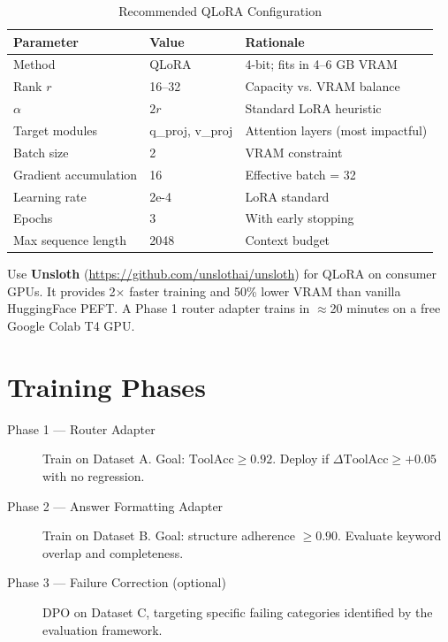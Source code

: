 \documentclass[12pt,a4paper]{report}
\begin{document}
\begin{table}[H]
\centering
\caption{Recommended QLoRA Configuration}
\begin{tabular}{@{}lll@{}}
\toprule
\textbf{Parameter} & \textbf{Value} & \textbf{Rationale} \\
\midrule
Method & QLoRA & 4-bit; fits in 4--6 GB VRAM \\
Rank $r$ & 16--32 & Capacity vs. VRAM balance \\
$\alpha$ & $2r$ & Standard LoRA heuristic \\
Target modules & q\_proj, v\_proj & Attention layers (most impactful) \\
Batch size & 2 & VRAM constraint \\
Gradient accumulation & 16 & Effective batch = 32 \\
Learning rate & 2e-4 & LoRA standard \\
Epochs & 3 & With early stopping \\
Max sequence length & 2048 & Context budget \\
\bottomrule
\end{tabular}
\end{table}

\begin{notebox}
Use \textbf{Unsloth} (\url{https://github.com/unslothai/unsloth}) for QLoRA on consumer GPUs. It provides 2$\times$ faster training and 50\% lower VRAM than vanilla HuggingFace PEFT. A Phase 1 router adapter trains in $\approx$20 minutes on a free Google Colab T4 GPU.
\end{notebox}

\section{Training Phases}

\begin{description}
  \item[Phase 1 --- Router Adapter] Train on Dataset A. Goal: $\text{ToolAcc} \geq 0.92$. Deploy if $\Delta\text{ToolAcc} \geq +0.05$ with no regression.
  \item[Phase 2 --- Answer Formatting Adapter] Train on Dataset B. Goal: structure adherence $\geq 0.90$. Evaluate keyword overlap and completeness.
  \item[Phase 3 --- Failure Correction (optional)] DPO on Dataset C, targeting specific failing categories identified by the evaluation framework.
\end{description}
\end{document}
